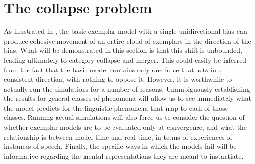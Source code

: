 \section{\label{sec:Iterativity}The collapse problem}

As illustrated in , the basic
exemplar model with a single unidirectional bias can produce cohesive
movement of an entire cloud of exemplars in the direction of the bias.
What will be demonstrated in this section is that this shift is unbounded,
leading ultimately to category collapse and merger. This could easily
be inferred from the fact that the basic model contains only one force
that acts in a consistent direction, with nothing to oppose it. However,
it is worthwhile to actually run the simulations for a number of reasons.
Unambiguously establishing the results for general classes of phenomena
will allow us to see immediately what the model predicts for the linguistic
phenomena that map to each of those classes. Running actual simulations
will also force us to consider the question of whether exemplar models
are to be evaluated only at convergence, and what the relationship
is between model time and real time, in terms of experiences of instances
of speech. Finally, the specific ways in which the models fail will
be informative regarding the mental representations they are meant to instantiate.


